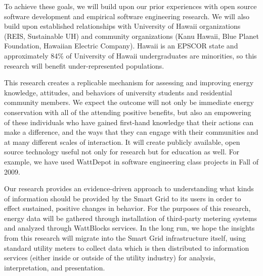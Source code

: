 To achieve these goals, we will build upon our prior experiences with open
source software development and empirical software engineering research. We
will also build upon established relationships with University of Hawaii
organizations (REIS, Sustainable UH) and community organizations (Kanu
Hawaii, Blue Planet Foundation, Hawaiian Electric Company).  Hawaii
is an EPSCOR state and approximately 84\% of University of Hawaii
undergraduates are minorities, so this research will benefit
under-represented populations. 

This research creates a replicable mechanism for assessing and improving
energy knowledge, attitudes, and behaviors of university students and
residential community members. We expect the outcome will not only be
immediate energy conservation with all of the attending positive benefits,
but also an empowering of these individuals who have gained first-hand
knowledge that their actions can make a difference, and the ways that they
can engage with their communities and at many different scales of
interaction.  It will create publicly available, open source technology
useful not only for research but for education as well.  For example, we
have used WattDepot in software engineering class projects in Fall of 2009.

Our research provides an evidence-driven approach to understanding what
kinds of information should be provided by the Smart Grid to its users in
order to effect sustained, positive changes in behavior.  For the purposes
of this research, energy data will be gathered through installation of
third-party metering systems and analyzed through WattBlocks services. In
the long run, we hope the insights from this research will migrate into the Smart
Grid infrastructure itself, using standard utility meters to collect data
which is then distributed to information services (either inside or outside
of the utility industry) for analysis, interpretation, and presentation.
